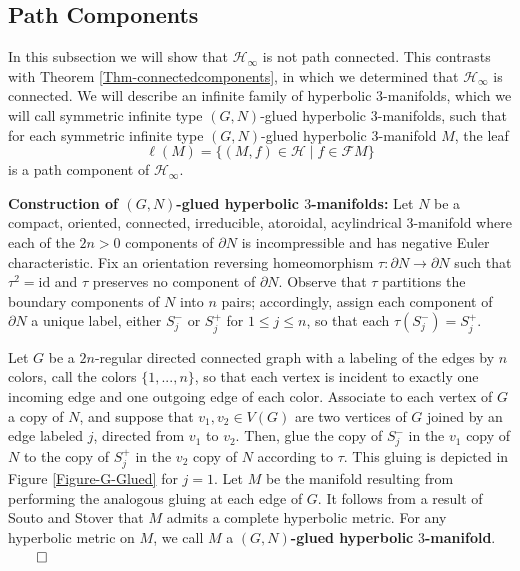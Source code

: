 \documentclass[11pt,leqno]{article}
\theoremstyle{introdef}
\numberwithin{lemma}{section}
\theoremstyle{definition}
\begin{document}



\subsection{Path Components}
\label{subsec-pathcomps}

In this subsection we will show that $\mathcal{H}_\infty$ is not path connected. This contrasts with Theorem \ref{Thm-connectedcomponents}, in which we determined that $\mathcal{H}_\infty$ is connected. We will describe an infinite family of hyperbolic $3$-manifolds, which we will call symmetric infinite type $(G,N)$-glued hyperbolic $3$-manifolds, such that for each symmetric infinite type $(G,N)$-glued hyperbolic $3$-manifold $M$, the leaf \[\ell(M)=\{(M,f)\in\mathcal{H}\;|\;f\in\mathcal{F}M\}\] is a path component of $\mathcal{H}_\infty$.\par

\textbf{Construction of $(G,N)$-glued hyperbolic $3$-manifolds:} Let $N$ be a compact, oriented, connected, irreducible, atoroidal, acylindrical $3$-manifold where each of the $2n>0$ components of $\partial N$ is incompressible and has negative Euler characteristic. Fix an orientation reversing homeomorphism $\tau:\partial N\rightarrow\partial N$ such that $\tau^2=\mathrm{id}$ and $\tau$ preserves no component of $\partial N$. Observe that $\tau$ partitions the boundary components of $N$ into $n$ pairs; accordingly, assign each component of $\partial N$ a unique label, either $S_j^-$ or $S_j^+$ for $1\leq j\leq n$, so that each $\tau(S_j^-)=S_j^+$. \par

Let $G$ be a $2n$-regular directed connected graph with a labeling of the edges by $n$ colors, call the colors $\{1,...,n\}$, so that each vertex is incident to exactly one incoming edge and one outgoing edge of each color. Associate to each vertex of $G$ a copy of $N$, and suppose that $v_1,v_2\in V(G)$ are two vertices of $G$ joined by an edge labeled $j$, directed from $v_1$ to $v_2$. Then, glue the copy of $S_j^-$ in the $v_1$ copy of $N$ to the copy of $S_j^+$ in the $v_2$ copy of $N$ according to $\tau$. This gluing is depicted in Figure \ref{Figure-G-Glued} for $j=1$. Let $M$ be the manifold resulting from performing the analogous gluing at each edge of $G$. It follows from a result of Souto and Stover \cite{SOUSTO} that $M$ admits a complete hyperbolic metric. For any hyperbolic metric on $M$, we call $M$ a $(G,N)$\textbf{-glued hyperbolic }$3$\textbf{-manifold}.$\qed$
\end{document}
